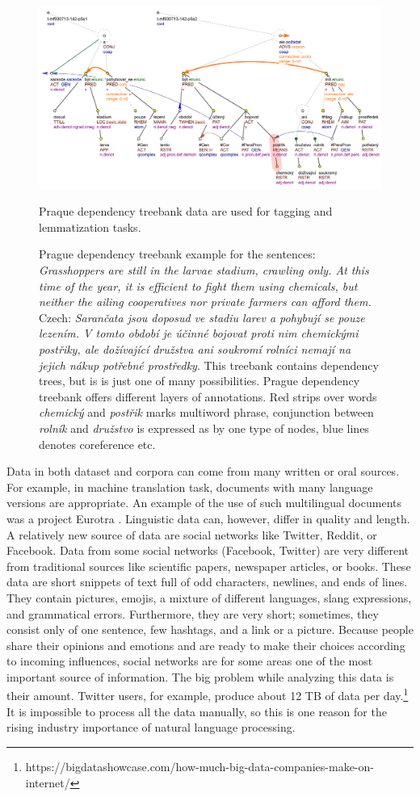 \begin{figure}
\includegraphics[width=1\textwidth]{../img/prague_dep_treebank.png}
\caption{
Prague dependency treebank example \cite{PDT35} for the sentences:
\textit{Grasshoppers are still in the larvae stadium, crawling only. At this time of the year, it is efficient to fight them using chemicals, but neither the ailing cooperatives nor private farmers can afford them.} Czech: \textit{Sarančata jsou doposud ve stadiu larev a pohybují se pouze lezením. V tomto období je účinné bojovat proti nim chemickými postřiky, ale dožívající družstva ani soukromí rolníci nemají na jejich nákup potřebné prostředky}. This treebank contains dependency trees, but is is just one of many possibilities. Prague dependency treebank offers different layers of annotations. Red strips over words \textit{chemický} and \textit{postřik} marks multiword phrase, conjunction between \textit{rolník} and \textit{družstvo} is expressed as by one type of nodes, blue lines denotes coreference etc.} Praque dependency treebank data are used for tagging and lemmatization tasks.
\label{fig:pdt}
\end{figure}

Data in both dataset and corpora can come from many written or oral sources. For example, in machine translation task, documents with many language versions are appropriate. An example of the use of such multilingual documents was a project Eurotra \citep{oakley1995final}. Linguistic data can, however,  differ in quality and length.  A relatively new source of data are social networks like Twitter, Reddit, or Facebook. Data from some social networks (Facebook, Twitter) are very different from traditional sources like scientific papers, newspaper articles, or books.  These data are short snippets of text full of odd characters, newlines, and ends of lines. They contain pictures, emojis, a mixture of different languages, slang expressions, and grammatical errors. Furthermore, they are very short; sometimes, they consist only of one sentence, few hashtags, and a link or a picture. Because people share their opinions and emotions and are ready to make their choices according to incoming influences, social networks are for some areas one of the most important source of information. The big problem while analyzing this data is their amount. Twitter users, for example, produce about 12 TB of data per day.\footnote{https://bigdatashowcase.com/how-much-big-data-companies-make-on-internet/} It is impossible to process all the data manually, so this is one reason for the rising industry importance of natural language processing.

